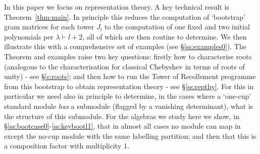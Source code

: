 \documentclass{article}
\newcommand{\ppm}[1]{\textcolor{red}{#1}}
\newcommand{\ppmm}[1]{#1}  %
\newcommand{\bajm}[1]{\textcolor{blue}{#1}}
\theoremstyle{definition}
\def\l{\lambda}
\numberwithin{equation}{subsection}
\begin{document}
In this paper we 
focus on representation theory. 
A key technical result is Theorem~\ref{thm:main}.
In principle this reduces the computation of 
`bootstrap' 
gram matrices for each tower $J_l$ 
to the computation of one fixed and two initial polynomials per $\l\vdash l+2$, 
all of which are then routine to determine. 
We then illustrate this with a comprehensive set of examples (see \S\ref{ss:examples0}). 
The Theorem and examples raise two key questions: 
firstly how to characterise roots (analogous to the characterisation for classical 
Chebyshev in terms of roots of unity) - see \S\ref{s:roots};
and then how to run the Tower of Recollement programme from this bootstrap to obtain representation theory
- see \S\ref{ss:repthy}. 
For this in particular we need also in principle to determine, in the cases where a `one-cup' standard module {\em has} a submodule (flagged by a vanishing determinant), 
what is the structure of this submodule. 
For the algebras we study here we show, in \S\ref{ss:bootcase0}-\ref{ss:keybootl1}, that 
in almost all cases 
\ppmm{no module can map in} except the no-cup module with the same labelling partition; and then that this 
is a composition factor with multiplicity 1. 
\end{document}
